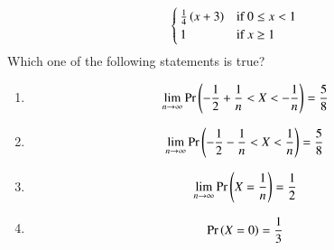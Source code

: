 \begin{enumerate}[label=\thechapter.\arabic*,ref=\thechapter.\theenumi]
\begin{align}
\begin{cases}
		\frac{1}{4}\left(x+3\right) & \text{if $0 \leq x < 1$}\\
		1 & \text{if $ x \geq 1$}\\
	\end{cases}
\end{align}
Which one of the following statements is true?
\begin{enumerate}[label=(\Alph*)]
    \item\begin{align} \lim_{n \to \infty} \Pr\left(-\frac{1}{2} + \frac{1}{n} < X < -\frac{1}{n}\right) = \frac{5}{8}\end{align}
    \item \begin{align}\lim_{n \to \infty} \Pr\left(-\frac{1}{2} - \frac{1}{n} < X < \frac{1}{n}\right) = \frac{5}{8}\end{align}
    \item \begin{align}\lim_{n \to \infty} \Pr\left(X = \frac{1}{n}\right) = \frac{1}{2}\end{align}
    \item \begin{align}\Pr\left(X = 0\right) = \frac{1}{3}\end{align}
\end{enumerate}


\end{enumerate}
